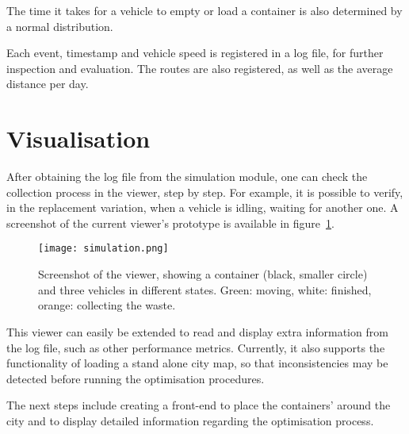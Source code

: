 The time it takes for a vehicle to empty or load a container is also
determined by a normal distribution.

Each event, timestamp and vehicle speed is registered in a log file, for
further inspection and evaluation. The routes are also registered, as well as
the average distance per day.






\section{Visualisation}
\label{section:visualisation}

After obtaining the log file from the simulation module, one can check the
collection process in the viewer, step by step. For example, it is possible
to verify, in the replacement variation, when a vehicle is idling, waiting
for another one. A screenshot of the current viewer's prototype is available
in figure~\ref{fig:simulation}.

\begin{figure}[h]
\centering
\texttt{[image: simulation.png]}
\caption{Screenshot of the viewer, showing a container (black, smaller circle)
and three vehicles in different states. Green: moving, white: finished, orange:
collecting the waste.}
\label{fig:simulation}
\end{figure}

This viewer can easily be extended to read and display extra information from
the log file, such as other performance metrics. Currently, it also supports
the functionality of loading a stand alone city map, so that inconsistencies
may be detected before running the optimisation procedures.

The next steps include creating a front-end to place the containers' around
the city and to display detailed information regarding the optimisation
process.


